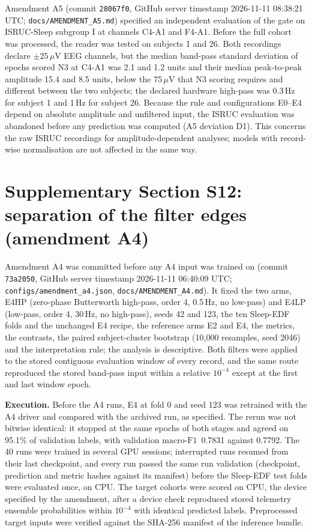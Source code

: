 \documentclass[10pt,a4paper]{article}
\newcommand{\mf}{\ensuremath{\mathrm{macro\text{-}F1}}}
\begin{document}
Amendment A5 (commit \texttt{28067f0}, GitHub server timestamp 2026-11-11 08:38:21 UTC;
\nolinkurl{docs/AMENDMENT_A5.md}) specified an independent evaluation of the gate on ISRUC-Sleep subgroup I at
channels C4-A1 and F4-A1. Before the full cohort was processed, the reader was tested on subjects 1 and 26. Both
recordings declare $\pm25\,\mu$V EEG channels, but the median band-pass standard deviation of epochs scored N3 at
C4-A1 was 2.1 and 1.2 units and their median peak-to-peak amplitude 15.4 and 8.5 units, below the 75\,$\mu$V that
N3 scoring requires and different between the two subjects; the declared hardware high-pass was 0.3\,Hz for subject
1 and 1\,Hz for subject 26. Because the rule and configurations E0--E4 depend on absolute amplitude and unfiltered
input, the ISRUC evaluation was abandoned before any prediction was computed (A5 deviation D1). This concerns the
raw ISRUC recordings for amplitude-dependent analyses; models with record-wise normalisation are not affected in the
same way.

\section*{Supplementary Section S12: separation of the filter edges (amendment A4)}
\label{sec:sup_a4}

Amendment A4 was committed before any A4 input was trained on (commit \texttt{73a2050}, GitHub server timestamp
2026-11-11 06:40:09 UTC; \nolinkurl{configs/amendment_a4.json}, \nolinkurl{docs/AMENDMENT_A4.md}). It fixed the two
arms, E4HP (zero-phase Butterworth high-pass, order 4, 0.5\,Hz, no low-pass) and E4LP (low-pass, order 4, 30\,Hz,
no high-pass), seeds 42 and 123, the ten Sleep-EDF folds and the unchanged E4 recipe, the reference arms E2 and E4,
the metrics, the contrasts, the paired subject-cluster bootstrap (10{,}000 resamples, seed 2046) and the
interpretation rule; the analysis is descriptive. Both filters were applied to the stored contiguous evaluation
window of every record, and the same route reproduced the stored band-pass input within a relative $10^{-4}$ except
at the first and last window epoch.

\textbf{Execution.} Before the A4 runs, E4 at fold 0 and seed 123 was retrained with the A4 driver and compared with
the archived run, as specified. The rerun was not bitwise identical: it stopped at the same epochs of both stages and
agreed on 95.1\% of validation labels, with validation \mf\ 0.7831 against 0.7792. The 40 runs were trained in
several GPU sessions; interrupted runs resumed from their last checkpoint, and every run passed the same run
validation (checkpoint, prediction and metric hashes against its manifest) before the Sleep-EDF test folds were
evaluated once, on CPU. The target cohorts were scored on CPU, the device specified by the amendment, after a device
check reproduced stored telemetry ensemble probabilities within $10^{-4}$ with identical predicted labels.
Preprocessed target inputs were verified against the SHA-256 manifest of the inference bundle.
\end{document}
